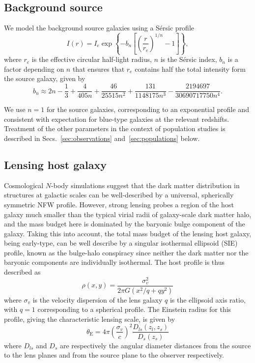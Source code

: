 \documentclass[twocolumn]{aastex62}
\begin{document}
\subsection{Background source}

We model the background source galaxies using a S\'{e}rsic profile
\begin{equation}
I(r)=I_{e} \exp \left\{-b_{n}\left[\left(\frac{r}{r_{e}}\right)^{1 / n}-1\right]\right\},
\end{equation}
where $r_e$ is the effective circular half-light radius, $n$ is the S\'{e}rsic index, $b_n$ is a factor depending on $n$ that ensures that $r_e$ contains half the total intensity form the source galaxy, given by~\citep{1999A&A...352..447C}
\begin{equation}
b_n \approx 2 n - \frac{1}{3} + \frac{4}{405 n} + \frac{46}{25515 n^2} + \frac{131}{1148175 n^3} - \frac{2194697}{30690717750 n^4}.
\end{equation}

We use $n=1$ for the source galaxies, corresponding to an exponential profile and consistent with expectation for blue-type galaxies at the relevant redshifts. Treatment of the other parameters in the context of population studies is described in Secs.~\ref{sec:observations} and~\ref{sec:populations} below.

\subsection{Lensing host galaxy}

Cosmological $N$-body simulations suggest that the dark matter distribution in structures at galactic scales can be well-described by a universal, spherically symmetric NFW profile. However, strong lensing probes a region of the host galaxy much smaller than the typical virial radii of galaxy-scale dark matter halo, and the mass budget here is dominated by the baryonic bulge component of the galaxy. Taking this into account, the total mass budget of the lensing host galaxy, being early-type, can be well describe by a singular isothermal ellipsoid (SIE) profile, known as the bulge-halo conspiracy since neither the dark matter nor the baryonic components are individually isothermal. The host profile is thus described as
\begin{equation}
\rho(x, y)=\frac{\sigma_{v}^{2}}{2 \pi G\left(x^{2} / q+q y^{2}\right)}
\end{equation}
where $\sigma_{v}$ is the velocity dispersion of the lens galaxy $q$ is the ellipsoid axis ratio, with $q=1$ corresponding to a spherical profile. The Einstein radius for this profile, giving the characteristic lensing scale, is given by
\begin{equation}
\theta_{\mathrm{E}}=4 \pi\left(\frac{\sigma_{v}}{c}\right)^{2} \frac{D_{l s}\left(z_{l}, z_{s}\right)}{D_{s}\left(z_{s}\right)}
\end{equation}
where $D_{ls}$ and $D_s$ are respectively the angular diameter distances from the source to the lens planes and from the source plane to the observer respectively. 
\end{document}
